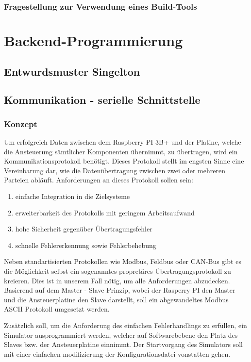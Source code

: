 \subsubsection{Fragestellung zur Verwendung eines Build-Tools}
\section{Backend-Programmierung}
\subsection{Entwurdsmuster Singelton}
\subsection{Kommunikation - serielle Schnittstelle}
\subsubsection{Konzept}

Um erfolgreich Daten zwischen dem Raspberry PI 3B+ und der Platine, welche die Ansteuerung sämtlicher Komponenten übernimmt, zu übertragen, wird ein Kommunikationsprotokoll benötigt.
Dieses Protokoll stellt im engsten Sinne eine Vereinbarung dar, wie die Datenübertragung zwischen zwei oder mehreren Parteien abläuft. Anforderungen an dieses Protokoll sollen sein:
\begin{enumerate}
    \item einfache Integration in die Zielsysteme
    \item erweiterbarkeit des Protokolls mit geringem Arbeitsaufwand
    \item hohe Sicherheit gegenüber Übertragungsfehler
    \item schnelle Fehlererkennung sowie Fehlerbehebung
\end{enumerate}
Neben standartisierten Protokollen wie Modbus, Feldbus oder CAN-Bus gibt es die Möglichkeit selbst ein sogenanntes propretäres Übertragungsprotokoll zu kreieren. Dies ist in unserem Fall nötig, um alle Anforderungen abzudecken.
Basierend auf dem Master - Slave Prinzip, wobei der Rasperry PI den Master und die Ansteuerplatine den Slave darstellt, soll ein abgewandeltes Modbus ASCII Protokoll umgesetzt werden.

Zusätzlich soll, um die Anforderung des einfachen Fehlerhandlings zu erfüllen, ein Simulator ausprogrammiert werden, welcher auf Softwarebebene den Platz des Slaves bzw. der Ansteuerplatine einnimmt.
Der Startvorgang des Simulators soll mit einer einfachen modifizierung der Konfigurationsdatei vonstatten gehen.

